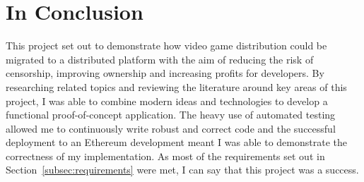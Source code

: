 \section{In Conclusion}

This project set out to demonstrate how video game distribution could be migrated to a distributed platform with the aim of reducing the risk of censorship, improving ownership and increasing profits for developers.
\x
By researching related topics and reviewing the literature around key areas of this project, I was able to combine modern ideas and technologies to develop a functional proof-of-concept application. The heavy use of automated testing allowed me to continuously write robust and correct code and the successful deployment to an Ethereum development meant I was able to demonstrate the correctness of my implementation.
\x
As most of the requirements set out in Section~\ref{subsec:requirements} were met, I can say that this project was a success.